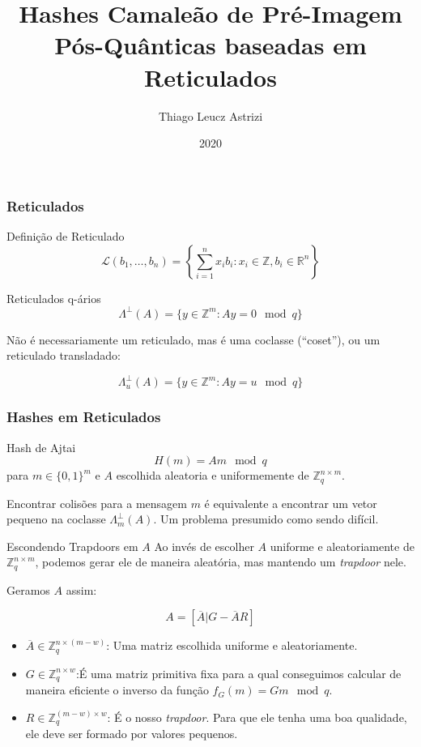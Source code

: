 \documentclass{beamer}
\title{Hashes Camaleão de Pré-Imagem Pós-Quânticas baseadas em
Reticulados}
\author{Thiago Leucz Astrizi}
\institute{UFSC}
\date{2020}
\begin{document}
\frame{\titlepage}

\begin{frame}
    \frametitle{Reticulados}
    \begin{block}{Definição de Reticulado}
    $$
    \mathcal{L}(b_1, \ldots, b_n)= \left\{\sum_{i=1}^nx_ib_i:x_i \in \mathbb{Z}, b_i\in \mathbb{R}^n\right\}
    $$
    \end{block}
    \begin{block}{Reticulados q-ários}
    $$
    \Lambda^{\perp}(A)=\{y \in \mathbb{Z}^m:Ay = 0 \mod q\}
    $$
    \end{block}
    
    Não é necessariamente um reticulado, mas é uma coclasse (``coset''),
    ou um reticulado transladado:
    
    $$
    \Lambda^{\perp}_u(A)=\{y \in \mathbb{Z}^m:Ay = u \mod q\}
    $$
\end{frame}

\begin{frame}
\frametitle{Hashes em Reticulados}

\begin{block}{Hash de Ajtai}
$$
H(m) = Am \mod q
$$
para $m\in \{0,1\}^m$ e $A$ escolhida aleatoria e uniformemente de
$\mathbb{Z}^{n\times m}_q$.
\end{block}

Encontrar colisões para a mensagem $m$ é equivalente a encontrar um
vetor pequeno na coclasse $\Lambda^{\perp}_m(A)$. Um problema
presumido como sendo difícil.

\end{frame}

\begin{frame}{Escondendo Trapdoors em $A$}
    Ao invés de escolher $A$ uniforme e aleatoriamente de
    $\mathbb{Z}^{n\times m}_q$, podemos gerar ele de maneira aleatória,
    mas mantendo um \textit{trapdoor} nele.
    
    Geramos $A$ assim:
    
    $$
    A=[\overline{A}|G-\overline{A}R]
    $$
    
    \begin{itemize}
        \item$\overline{A}\in\mathbb{Z}_q^{n\times(m-w)}$: Uma matriz
        escolhida uniforme e aleatoriamente.
        \item$G\in\mathbb{Z}_q^{n \times w}$:É uma matriz primitiva
        fixa para a qual conseguimos calcular de maneira eficiente o
        inverso da função $f_G(m)=Gm \mod q$.
        \item$R\in\mathbb{Z}_q^{(m-w)\times w}$: É o nosso 
        \textit{trapdoor}. Para que ele tenha uma boa qualidade, ele
        deve ser formado por valores pequenos.
    \end{itemize}
\end{frame}
\end{document}
